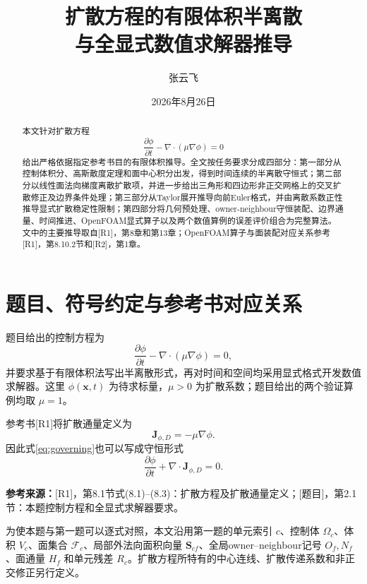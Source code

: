 \documentclass[UTF8,12pt,a4paper]{ctexart}
\title{\bfseries 扩散方程的有限体积半离散\\与全显式数值求解器推导}
\author{张云飞}
\date{2026年8月26日}
\numberwithin{equation}{section}
\newcommand{\Rone}{\textnormal{[R1]}}
\newcommand{\Rtwo}{\textnormal{[R2]}}
\newcommand{\Task}{\textnormal{[题目]}}
\newcommand{\source}[1]{%
  \par\smallskip
  \noindent\colorbox{sourcebg}{%
    \parbox{0.955\linewidth}{\raggedright\footnotesize\color{sourcegray}\textbf{参考来源：}#1}%
  }
  \par\smallskip
}
\newcommand{\Sf}{\bm S}
\newcommand{\xf}{\bm x}
\begin{document}
\maketitle

\begin{abstract}
本文针对扩散方程
\[
  \frac{\partial\phi}{\partial t}-\nabla\cdot(\mu\nabla\phi)=0
\]
给出严格依据指定参考书目的有限体积推导。全文按任务要求分成四部分：第一部分从控制体积分、高斯散度定理和面中心积分出发，得到时间连续的半离散守恒式；第二部分以线性面法向梯度离散扩散项，并进一步给出三角形和四边形非正交网格上的交叉扩散修正及边界条件处理；第三部分从Taylor展开推导向前Euler格式，并由离散系数正性推导显式扩散稳定性限制；第四部分将几何预处理、owner-neighbour守恒装配、边界通量、时间推进、OpenFOAM显式算子以及两个数值算例的误差评价组合为完整算法。文中的主要推导取自\Rone，第8章和第13章；OpenFOAM算子与面装配对应关系参考\Rone，第8.10.2节和\Rtwo，第1章。
\end{abstract}

\tableofcontents
\newpage

\section*{题目、符号约定与参考书对应关系}

题目给出的控制方程为
\begin{equation}
  \frac{\partial\phi}{\partial t}
  -\nabla\cdot(\mu\nabla\phi)=0,
  \label{eq:governing}
\end{equation}
并要求基于有限体积法写出半离散形式，再对时间和空间均采用显式格式开发数值求解器。这里 $\phi(\xf,t)$ 为待求标量，$\mu>0$ 为扩散系数；题目给出的两个验证算例均取 $\mu=1$。

参考书\Rone 将扩散通量定义为
\begin{equation}
  \bm J_{\phi,D}=-\mu\nabla\phi.
  \label{eq:diffusive_flux_definition}
\end{equation}
因此式\eqref{eq:governing}也可以写成守恒形式
\begin{equation}
  \frac{\partial\phi}{\partial t}
  +\nabla\cdot\bm J_{\phi,D}=0.
  \label{eq:conservative_flux_form}
\end{equation}

\source{\Rone，第8.1节式(8.1)--(8.3)：扩散方程及扩散通量定义；\Task，第2.1节：本题控制方程和全显式求解器要求。}

为使本题与第一题可以逐式对照，本文沿用第一题的单元索引 $c$、控制体
$\Omega_c$、体积 $V_c$、面集合 $\mathcal F_c$、局部外法向面积向量
$\Sf_{cf}$、全局owner--neighbour记号 $O_f,N_f$、面通量 $H_f$ 和单元残差
$R_c$。扩散方程所特有的中心连线、扩散传递系数和非正交修正另行定义。
\end{document}
